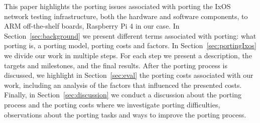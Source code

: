 This paper highlights the porting issues associated with porting the IxOS
network testing infrastructure, both the hardware and software components, to
ARM off-the-shelf boards, Raspberry Pi 4 in our case. In
Section~\ref{sec:background} we present different terms associated with porting:
what porting is, a porting model, porting costs and factors. In
Section~\ref{sec:portingIxos} we divide our work in multiple steps. For each
step we present a description, the targets and milestones, and the final
results. After the porting process is discussed, we highlight in
Section~\ref{sec:eval} the porting costs associated with our work, including an
analysis of the factors that influenced the presented costs. Finally, in
Section~\ref{sec:discussion} we conduct a discussion about the porting process
and the porting costs where we investigate porting difficulties, observations
about the porting tasks and ways to improve the porting process. 
